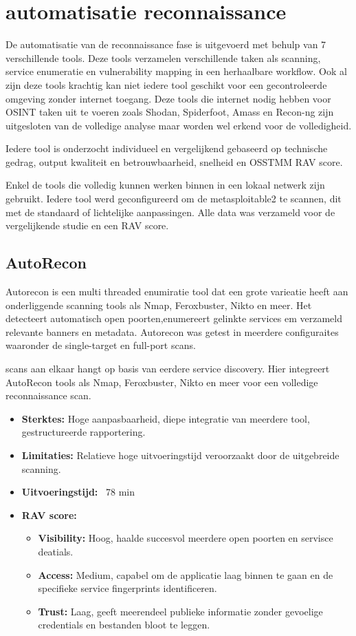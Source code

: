 \section{automatisatie reconnaissance}

De automatisatie van de reconnaissance fase is uitgevoerd met behulp van 7 verschillende tools.
Deze tools verzamelen verschillende taken als scanning, service enumeratie en vulnerability mapping in een herhaalbare workflow.
Ook al zijn deze tools krachtig kan niet iedere tool geschikt voor een gecontroleerde omgeving zonder internet toegang.
Deze tools die internet nodig hebben voor OSINT taken uit te voeren zoals Shodan, Spiderfoot, Amass en Recon-ng zijn uitgesloten van de volledige analyse maar worden wel erkend voor de volledigheid.

Iedere tool is onderzocht individueel en vergelijkend gebaseerd op technische gedrag, output kwaliteit en betrouwbaarheid, snelheid en OSSTMM RAV score.

Enkel de tools die volledig kunnen werken binnen in een lokaal netwerk zijn gebruikt.
Iedere tool werd geconfigureerd om de metasploitable2 te scannen, dit met de standaard of lichtelijke aanpassingen.
Alle data was verzameld voor de vergelijkende studie en een RAV score.

\subsection{AutoRecon}
Autorecon is een multi threaded enumiratie tool dat een grote varieatie heeft aan onderliggende scanning tools als Nmap, Feroxbuster, Nikto en meer.
Het detecteert automatisch open poorten,enumereert gelinkte services em verzameld relevante banners en metadata. 
Autorecon was getest in meerdere configuraites waaronder de single-target en full-port scans. 

scans aan elkaar hangt op basis van eerdere service discovery. 
Hier integreert AutoRecon tools als Nmap, Feroxbuster, Nikto en meer voor een volledige reconnaissance scan.

\begin{itemize}
  \item \textbf{Sterktes:} Hoge aanpasbaarheid, diepe integratie van meerdere tool, gestructureerde rapportering.
  \item \textbf{Limitaties:} Relatieve hoge uitvoeringstijd veroorzaakt door de uitgebreide scanning.
  \item \textbf{Uitvoeringstijd:} ~78 min
  \item \textbf{RAV score:}
    {\small
    \begin{itemize}
      \item \textbf{Visibility:} Hoog, haalde succesvol meerdere open poorten en servisce deatials. 
      \item \textbf{Access:} Medium, capabel om de  applicatie laag binnen te gaan en de specifieke service fingerprints identificeren. 
      \item \textbf{Trust:} Laag, geeft meerendeel publieke informatie zonder gevoelige credentials en bestanden bloot te leggen. 
    \end{itemize}
    } 
\end{itemize}

